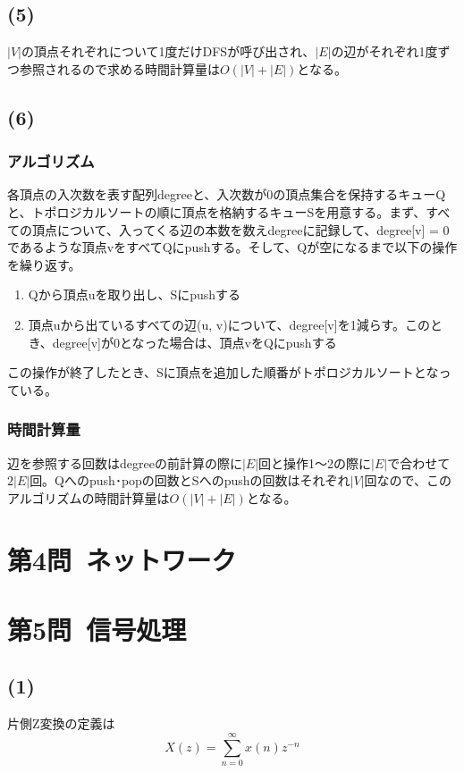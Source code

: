 \documentclass[a4paper,12pt,xelatex,ja=standard]{bxjsarticle}
\begin{document}
\subsection*{(5)}
$|V|$の頂点それぞれについて1度だけDFSが呼び出され、$|E|$の辺がそれぞれ1度ずつ参照されるので求める時間計算量は$O(|V| + |E|)$となる。

\subsection*{(6)}
\subsubsection*{アルゴリズム}
各頂点の入次数を表す配列degreeと、入次数が0の頂点集合を保持するキューQと、トポロジカルソートの順に頂点を格納するキューSを用意する。まず、すべての頂点について、入ってくる辺の本数を数えdegreeに記録して、degree[v] = 0であるような頂点vをすべてQにpushする。そして、Qが空になるまで以下の操作を繰り返す。
\begin{enumerate}
  \item Qから頂点uを取り出し、Sにpushする
  \item 頂点uから出ているすべての辺(u, v)について、degree[v]を1減らす。このとき、degree[v]が0となった場合は、頂点vをQにpushする
\end{enumerate}
この操作が終了したとき、Sに頂点を追加した順番がトポロジカルソートとなっている。

\subsubsection*{時間計算量}
辺を参照する回数はdegreeの前計算の際に$|E|$回と操作1〜2の際に$|E|$で合わせて$2|E|$回。Qへのpush･popの回数とSへのpushの回数はそれぞれ$|V|$回なので、このアルゴリズムの時間計算量は$O(|V| + |E|)$となる。

\section*{第4問\ ネットワーク}

\section*{第5問\ 信号処理}
\subsection*{(1)}
片側Z変換の定義は
\[
  X(z) = \sum^{\infty}_{n=0}x(n)z^{-n}
\]
\end{document}
